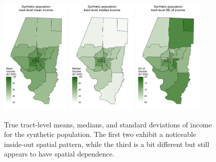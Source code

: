 \documentclass[12pt]{article}
\begin{document}
\begin{figure}
\centering
\includegraphics[width = 0.3\textwidth]{mean.png}
\includegraphics[width = 0.3\textwidth]{median.png}
\includegraphics[width = 0.3\textwidth]{sd.png}
\caption{True tract-level means, medians, and standard deviations of income for the synthetic population. The first two exhibit a noticeable inside-out spatial pattern, while the third is a bit different but still appears to have spatial dependence.}
\label{fig:pops}
\end{figure}
\end{document}
